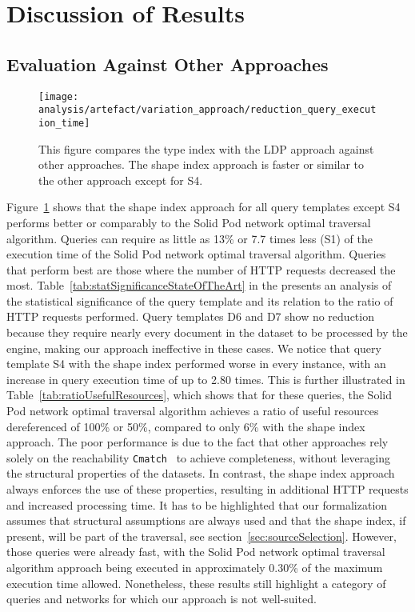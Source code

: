 \section{Discussion of Results}

\subsection{Evaluation Against Other Approaches}

\begin{figure}[h]
    \centering
    \texttt{[image: analysis/artefact/variation\_approach/reduction\_query\_execution\_time]}
    \caption{
        This figure compares the type index with the LDP approach against other approaches.
        The shape index approach is faster or similar to the other approach except for S4.
    }
    \label{fig:compApproach}
\end{figure}


Figure~\ref{fig:compApproach} shows that the shape index approach for all query templates except S4 performs better or comparably to the Solid Pod network optimal traversal algorithm.
Queries can require as little as 13\% or 7.7 times less (S1) of the execution time of the Solid Pod network optimal traversal algorithm.
Queries that perform best are those where the number of HTTP requests decreased the most.
Table~\ref{tab:statSignificanceStateOfTheArt} in the  presents an analysis of the statistical significance of the query template and its relation to the ratio of HTTP requests performed.
Query templates D6 and D7 show no reduction because they require nearly every document in the dataset to be processed by the engine, making our approach ineffective in these cases.
We notice that query template S4 with the shape index performed worse in every instance, with an increase in query execution time of up to 2.80 times.
This is further illustrated in Table~\ref{tab:ratioUsefulResources}, which shows that for these queries, the Solid Pod network optimal traversal algorithm achieves a ratio of useful resources dereferenced of 100\% or 50\%, compared to only 6\% with the shape index approach.
The poor performance is due to the fact that other approaches rely solely on the reachability \texttt{Cmatch}~\cite{hartig2016walking}  to achieve completeness, without leveraging the structural properties of the datasets.
In contrast, the shape index approach always enforces the use of these properties, resulting in additional HTTP requests and increased processing time.
It has to be highlighted that our formalization assumes that structural assumptions are always used and that the shape index, if present, will be part of the traversal, see section~\ref{sec:sourceSelection}.
However, those queries were already fast, with the Solid Pod network optimal traversal algorithm approach being executed in approximately 0.30\% of the maximum execution time allowed.
Nonetheless, these results still highlight a category of queries and networks for which our approach is not well-suited.

